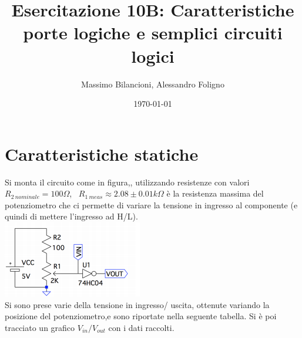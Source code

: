 \documentclass[10pt,a4paper]{article}
\date{\today}
\title{Esercitazione 10B: Caratteristiche porte logiche e semplici circuiti logici}
\author{Massimo Bilancioni, Alessandro Foligno}
\begin{document}
	\maketitle
	
	\section{Caratteristiche statiche}
	Si monta il circuito come in figura,, utilizzando resistenze con valori  $R_{2~nominale}=100\Omega $,~
	$R_{1~meas}\approx2.08\pm0.01 k \Omega$ è la resistenza massima del potenziometro che ci permette di variare la tensione in ingresso al componente (e quindi di mettere l'ingresso ad H/L).\\
	\includegraphics[scale=0.9]{Cattura.png}\centering
\\Si sono prese varie della tensione in ingresso/ uscita,  ottenute variando la posizione del potenziometro,e sono riportate nella seguente tabella. Si è poi tracciato un grafico $V_{in}/V_{out}$ con i dati raccolti. \\
	
\end{document}

